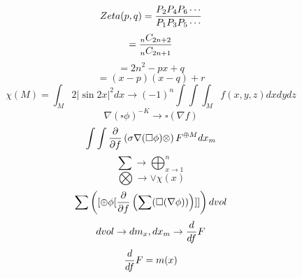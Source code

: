 \documentclass{jsarticle}
\begin{document}
\title{}
\author{}
\date{}
\maketitle

  $$ Zeta(p,q) = {{P_2 P_4 P_6 \cdots} \over {P_1 P_3 P_5 \cdots}} $$
  $$ = {{{{}_n C_{2n + 2}} \over {{}_n C_{2n + 1}}}} $$
  $$ = 2 n^2 - px + q $$
  $$ = (x - p)(x - q) + r $$
  $$ \chi(M) = \int_M 2|\sin 2x|^2dx \to (-1)^n \int \int \int_M
     f(x,y,z)dxdydz $$
  $$ \nabla (\square \phi)^{-K} \to \square(\nabla f) $$
  $$ \int \int {\partial \over \partial f} \left( \sigma \nabla(\square \phi)
    \otimes \right) F^{\oplus M}dx_m $$
  $$ \sum \to \bigoplus_{x \to 1}^{n} $$
  $$ \bigotimes \to \vee \chi (x) $$
  $$ \sum \left( [\oplus \phi 
	  [{\partial \over \partial f} \left(
     \sum (\square (\nabla \phi)) \right)]] \right)dvol $$
  $$ dvol \to dm_x, dx_m \to {d \over df}F $$
  $$ {d \over df} F = m(x) $$
  
\end{document}
